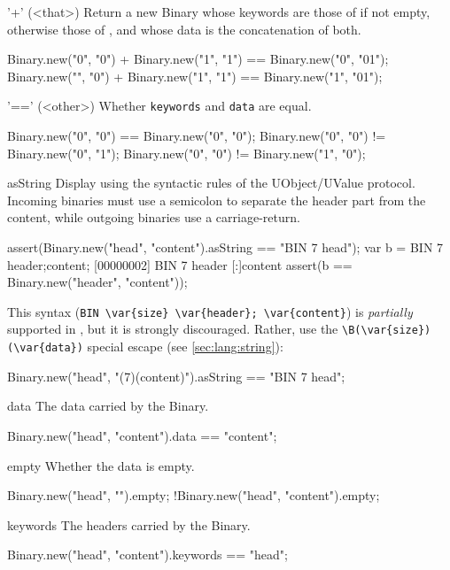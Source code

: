 \begin{urbiscriptapi}
\item['+'](<that>)%
  Return a new Binary whose keywords are those of \this if
  not empty, otherwise those of , and whose data is the
  concatenation of both.
\begin{urbiassert}
Binary.new("0", "0") + Binary.new("1", "1")
       == Binary.new("0", "01");
Binary.new("", "0") + Binary.new("1", "1")
       == Binary.new("1", "01");
\end{urbiassert}


\item['=='](<other>)%
  Whether \lstinline|keywords| and \lstinline|data| are equal.
\begin{urbiassert}
Binary.new("0", "0") == Binary.new("0", "0");
Binary.new("0", "0") != Binary.new("0", "1");
Binary.new("0", "0") != Binary.new("1", "0");
\end{urbiassert}


\item[asString]
  Display using the syntactic rules of the UObject/UValue protocol.
  Incoming binaries must use a semicolon to separate the header part
  from the content, while outgoing binaries use a carriage-return.
\begin{urbiscript}
assert(Binary.new("head", "content").asString
       == "BIN 7 head\ncontent");
var b = BIN 7 header;content;
[00000002] BIN 7 header
[:]content
assert(b == Binary.new("header", "content"));
\end{urbiscript}

This syntax (\lstinline|BIN \var{size} \var{header}; \var{content}|)
is \emph{partially} supported in \us, but it is strongly discouraged.
Rather, use the \lstinline|\B(\var{size})(\var{data})| special escape
(see \autoref{sec:lang:string}):

\begin{urbiassert}
Binary.new("head", "\B(7)(content)").asString
       == "BIN 7 head\ncontent";
\end{urbiassert}


\item[data]
  The data carried by the Binary.
\begin{urbiassert}
Binary.new("head", "content").data == "content";
\end{urbiassert}


\item[empty]
  Whether the data is empty.
\begin{urbiassert}
Binary.new("head", "").empty;
!Binary.new("head", "content").empty;
\end{urbiassert}


\item[keywords]
  The headers carried by the Binary.
\begin{urbiassert}
Binary.new("head", "content").keywords == "head";
\end{urbiassert}
\end{urbiscriptapi}


